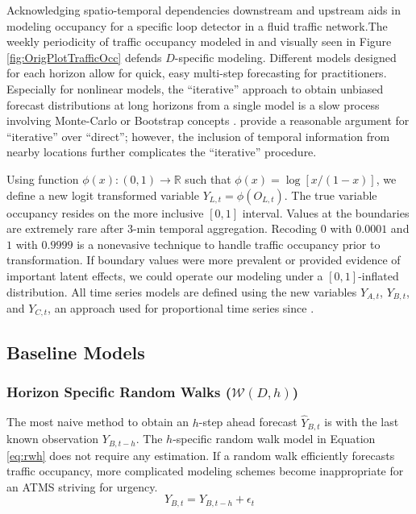 Acknowledging spatio-temporal dependencies downstream and upstream aids in modeling occupancy for a specific loop detector in a fluid traffic network\citep{Kamarianakis2005,Min2010,Min2011,Stathopoulos2003}.The weekly periodicity of traffic occupancy modeled in \cite{Williams1999,Ghosh2007,Kamarianakis2010} and visually seen in Figure \ref{fig:OrigPlotTrafficOcc} defends $D$-specific modeling. Different models designed for each horizon allow for quick, easy multi-step forecasting for practitioners. Especially for nonlinear models, the ``iterative'' approach to obtain unbiased forecast distributions at long horizons from a single model is a slow process involving Monte-Carlo or Bootstrap concepts \citep{Peguin1994,Lundbergh2002}. \cite{Marcellino2006} provide a reasonable argument for ``iterative'' over ``direct''; however, the inclusion of temporal information from nearby locations further complicates the ``iterative'' procedure.

Using function $\phi(x):(0,1)\to\mathbb{R}$ such that $\phi(x)=\log [x/(1-x)]$, we define a new logit transformed variable $Y_{L,t}=\phi(O_{L,t})$. The true variable occupancy resides on the more inclusive $[0,1]$ interval. Values at the boundaries are extremely rare after 3-min temporal aggregation. Recoding $0$ with $0.0001$ and $1$ with $0.9999$ is a nonevasive technique to handle traffic occupancy prior to transformation. If boundary values were more prevalent or provided evidence of important latent effects, we could operate our modeling under a $[0,1]$-inflated distribution. All time series models are defined using the new variables $Y_{A,t}$, $Y_{B,t}$, and $Y_{C,t}$, an approach used for proportional time series since \cite{Wallis1987}. 

\subsection{Baseline Models}

\subsubsection{Horizon Specific Random Walks ($\mathcal{W}(D,h)$)}
The most naive method to obtain an $h$-step ahead forecast $\widehat{Y}_{B,t}$ is with the last known observation $Y_{B,t-h}$. The $h$-specific random walk model in Equation \ref{eq:rwh} does not require any estimation. If a random walk efficiently forecasts traffic occupancy, more complicated modeling schemes become inappropriate for an ATMS striving for urgency.
\begin{equation}
\label{eq:rwh}
Y_{B,t}=Y_{B,t-h}+\epsilon_t
\end{equation}

